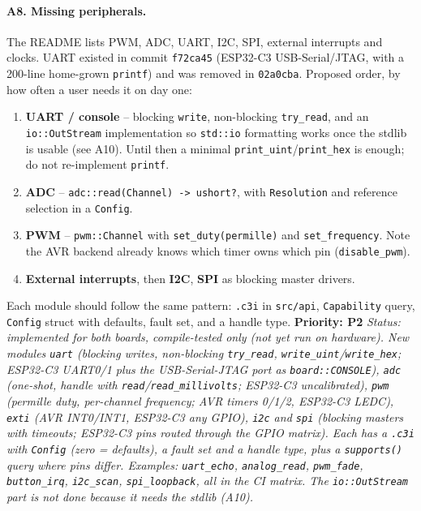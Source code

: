 \documentclass[11pt,a4paper]{article}
\newcommand{\pkg}[1]{\texttt{#1}}
\newcommand{\prio}[1]{\textbf{Priority: #1}}
\begin{document}
\paragraph{A8. Missing peripherals.}
The README lists PWM, ADC, UART, I2C, SPI, external interrupts and clocks. UART existed in commit
\pkg{f72ca45} (ESP32-C3 USB-Serial/JTAG, with a 200-line home-grown \pkg{printf}) and was removed
in \pkg{02a0cba}. Proposed order, by how often a user needs it on day one:
\begin{enumerate}
  \item \textbf{UART / console} -- blocking \pkg{write}, non-blocking \pkg{try\_read}, and an
        \pkg{io::OutStream} implementation so \pkg{std::io} formatting works once the stdlib
        is usable (see A10). Until then a minimal \pkg{print\_uint}/\pkg{print\_hex} is enough;
        do not re-implement \pkg{printf}.
  \item \textbf{ADC} -- \pkg{adc::read(Channel) -> ushort?}, with \pkg{Resolution} and reference
        selection in a \pkg{Config}.
  \item \textbf{PWM} -- \pkg{pwm::Channel} with \pkg{set\_duty(permille)} and \pkg{set\_frequency}.
        Note the AVR backend already knows which timer owns which pin (\pkg{disable\_pwm}).
  \item \textbf{External interrupts}, then \textbf{I2C}, \textbf{SPI} as blocking master drivers.
\end{enumerate}
Each module should follow the same pattern: \pkg{.c3i} in \pkg{src/api}, \pkg{Capability} query,
\pkg{Config} struct with defaults, fault set, and a handle type. \prio{P2}
\textit{Status: implemented for both boards, compile-tested only (not yet run on hardware). New modules \pkg{uart} (blocking writes, non-blocking \pkg{try\_read}, \pkg{write\_uint}/\pkg{write\_hex}; ESP32-C3 UART0/1 plus the USB-Serial-JTAG port as \pkg{board::CONSOLE}), \pkg{adc} (one-shot, handle with \pkg{read}/\pkg{read\_millivolts}; ESP32-C3 uncalibrated), \pkg{pwm} (permille duty, per-channel frequency; AVR timers 0/1/2, ESP32-C3 LEDC), \pkg{exti} (AVR INT0/INT1, ESP32-C3 any GPIO), \pkg{i2c} and \pkg{spi} (blocking masters with timeouts; ESP32-C3 pins routed through the GPIO matrix). Each has a \pkg{.c3i} with \pkg{Config} (zero = defaults), a fault set and a handle type, plus a \pkg{supports()} query where pins differ. Examples: \pkg{uart\_echo}, \pkg{analog\_read}, \pkg{pwm\_fade}, \pkg{button\_irq}, \pkg{i2c\_scan}, \pkg{spi\_loopback}, all in the CI matrix. The \pkg{io::OutStream} part is not done because it needs the stdlib (A10).}
\end{document}
